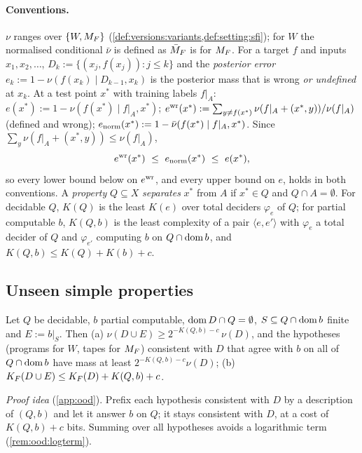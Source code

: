 \paragraph{Conventions.} $\nu$ ranges over $\{W,M_{F}\}$ (\cref{def:versions:variants,def:setting:sfi}); for $W$ the normalised conditional $\bar\nu$ is defined as $\bar{M}_{F}$ is for $M_{F}$. For a target $f$ and inputs $x_1,x_2,\dots$, $D_k:=\{(x_j,f(x_j)):j\le k\}$ and the \emph{posterior error} $e_k:=1-\nu(f(x_k)\mid D_{k-1},x_k)$ is the posterior mass that is wrong \emph{or undefined} at $x_k$. At a test point $x^*$ with training labels $f|_A$: $e(x^*):=1-\nu(f(x^*)\mid f|_A,x^*)$; $e^{\rm wr}(x^*):=\sum_{y\ne f(x^*)}\nu(f|_A+(x^*,y))/\nu(f|_A)$ (defined and wrong); $e_{\rm norm}(x^*):=1-\bar\nu(f(x^*)\mid f|_A,x^*)$. Since $\sum_y\nu(f|_A+(x^*,y))\le\nu(f|_A)$,
\begin{equation}\label{eq:ood:errors}
e^{\rm wr}(x^*)\ \le\ e_{\rm norm}(x^*)\ \le\ e(x^*),
\end{equation}
so every lower bound below on $e^{\rm wr}$, and every upper bound on $e$, holds in both conventions. A \emph{property} $Q\subseteq X$ \emph{separates} $x^*$ from $A$ if $x^*\in Q$ and $Q\cap A=\emptyset$. For decidable $Q$, $K(Q)$ is the least $K(e)$ over total deciders $\varphi_e$ of $Q$; for partial computable $b$, $K(Q,b)$ is the least complexity of a pair $\langle e,e'\rangle$ with $\varphi_e$ a total decider of $Q$ and $\varphi_{e'}$ computing $b$ on $Q\cap\operatorname{dom} b$, and $K(Q,b)\le K(Q)+K(b)+c$.

\subsection{Unseen simple properties}\label{sec:ood:prop}

\begin{proposition}\label{prop:ood:hanni}
Let $Q$ be decidable, $b$ partial computable, $\operatorname{dom} D\cap Q=\emptyset$, $S\subseteq Q\cap\operatorname{dom} b$ finite and $E:=b|_S$. Then (a) $\nu(D\cup E)\ge2^{-K(Q,b)-c}\,\nu(D)$, and the hypotheses (programs for $W$, tapes for $M_{F}$) consistent with $D$ that agree with $b$ on all of $Q\cap\operatorname{dom} b$ have mass at least $2^{-K(Q,b)-c}\nu(D)$; (b) $K_{F}(D\cup E)\le K_{F}(D)+K(Q,b)+c$.
\end{proposition}

\emph{Proof idea} (\cref{app:ood}). Prefix each hypothesis consistent with $D$ by a description of $(Q,b)$ and let it answer $b$ on $Q$; it stays consistent with $D$, at a cost of $K(Q,b)+c$ bits. Summing over all hypotheses avoids a logarithmic term (\cref{rem:ood:logterm}).

